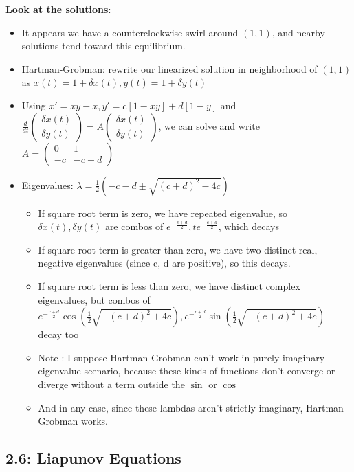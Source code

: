 \documentclass[11pt, oneside]{article}   	%
\begin{document}
\begin{itemize}
\textbf{Look at the solutions}:
\begin{itemize}
\item It appears we have a counterclockwise swirl around $(1,1)$, and nearby solutions tend toward this equilibrium.
\item Hartman-Grobman: rewrite our linearized solution in neighborhood of $(1,1)$ as $x(t) = 1 + \delta x(t), y(t) = 1 + \delta y(t)$
\item Using $x' = xy-x, y'=c[1-xy]+d[1-y]$ and $\frac{d}{dt}\begin{pmatrix} \delta x(t) \\ \delta y(t) \end{pmatrix} = A\begin{pmatrix} \delta x(t) \\ \delta y(t) \end{pmatrix}$, we can solve and write $A = \begin{pmatrix} 0 & 1 \\ -c & -c-d  \end{pmatrix} $
\item Eigenvalues: $\lambda = \frac{1}{2}(-c -d \pm \sqrt{(c+d)^2 - 4c})$
\begin{itemize}
\item If square root term is zero, we have repeated eigenvalue, so $\delta x(t), \delta y(t)$ are combos of $e^{-\frac{c+d}{2}}, te^{-\frac{c+d}{2}}$, which decays
\item If square root term is greater than zero, we have two distinct real, negative eigenvalues (since c, d are positive), so this decays.
\item If square root term is less than zero, we have distinct complex eigenvalues, but combos of $e^{-\frac{c+d}{2}} \cos (\frac{1}{2} \sqrt{-(c+d)^2+4c}), e^{-\frac{c+d}{2}} \sin (\frac{1}{2} \sqrt{-(c+d)^2+4c})$ decay too
\item Note : I suppose Hartman-Grobman can't work in purely imaginary eigenvalue scenario, because these kinds of functions don't converge or diverge without a term outside the $\sin$ or $\cos$ 
\item And in any case, since these lambdas aren't strictly imaginary, Hartman-Grobman works.
\end{itemize}

\end{itemize}

\end{itemize}

\subsection{2.6: Liapunov Equations}
\end{document}
